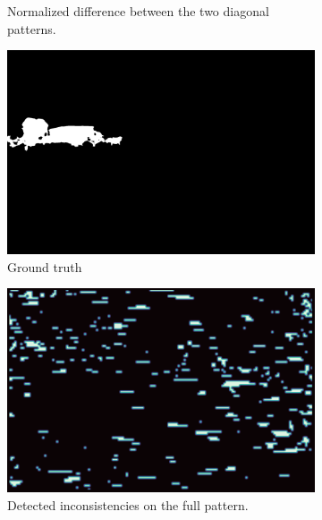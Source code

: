 \documentclass{ipol}
\begin{document}
\begin{figure}[ht]
\begin{subfigure}[t]{.3585\linewidth}
                \caption{Normalized difference between the two diagonal patterns.}
        \end{subfigure}

        \begin{subfigure}[t]{.301\linewidth}
                \includegraphics[width=\linewidth]{images/aahd_nodual/mask_s.png}
                \caption{Ground truth}
        \end{subfigure}\hfill%
        \begin{subfigure}[t]{.301\linewidth}
                \includegraphics[width=\linewidth]{images/aahd_nodual/out_inconsistent_grid_thr_fig.png}
                \caption{Detected inconsistencies on the full pattern.}
        \end{subfigure}\hfill%
        \begin{subfigure}[t]{.365\linewidth}

\end{subfigure}
\end{figure}
\end{document}
